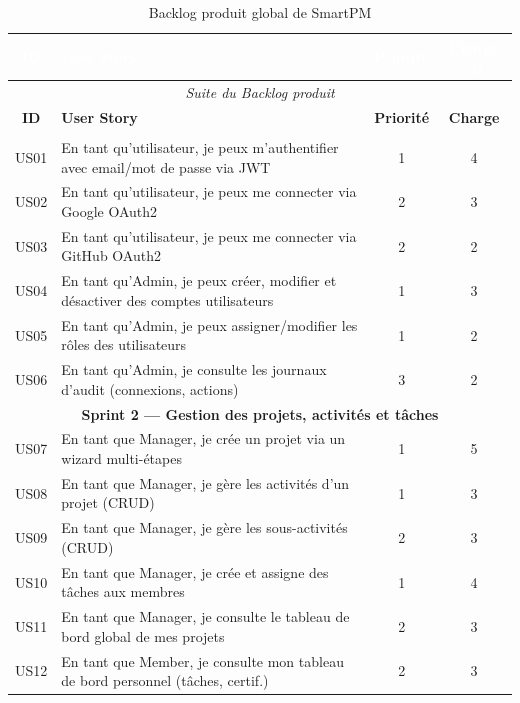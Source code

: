 \begin{longtable}{|c|p{7cm}|c|c|}
  \caption{Backlog produit global de SmartPM}
  \label{tab:backlog} \\
  \hline
  \rowcolor{tablehead}
  \textcolor{white}{\textbf{ID}} &
  \textcolor{white}{\textbf{User Story}} &
  \textcolor{white}{\textbf{Priorité}} &
  \textcolor{white}{\textbf{Charge (j)}} \\
  \hline
  \endfirsthead
  \multicolumn{4}{c}{\textit{Suite du Backlog produit}} \\
  \hline
  \textbf{ID} & \textbf{User Story} & \textbf{Priorité} & \textbf{Charge} \\
  \hline
  \endhead
  \hline
  \endfoot

  \multicolumn{4}{|c|}{\cellcolor{primaryblue!20}\textbf{Sprint 1 — Authentification \& Gestion des utilisateurs}} \\
  \hline
  US01 & En tant qu'utilisateur, je peux m'authentifier avec email/mot de passe via JWT & 1 & 4 \\
  \hline
  US02 & En tant qu'utilisateur, je peux me connecter via Google OAuth2 & 2 & 3 \\
  \hline
  US03 & En tant qu'utilisateur, je peux me connecter via GitHub OAuth2 & 2 & 2 \\
  \hline
  US04 & En tant qu'Admin, je peux créer, modifier et désactiver des comptes utilisateurs & 1 & 3 \\
  \hline
  US05 & En tant qu'Admin, je peux assigner/modifier les rôles des utilisateurs & 1 & 2 \\
  \hline
  US06 & En tant qu'Admin, je consulte les journaux d'audit (connexions, actions) & 3 & 2 \\
  \hline

  \multicolumn{4}{|c|}{\cellcolor{primaryblue!20}\textbf{Sprint 2 — Gestion des projets, activités et tâches}} \\
  \hline
  US07 & En tant que Manager, je crée un projet via un wizard multi-étapes & 1 & 5 \\
  \hline
  US08 & En tant que Manager, je gère les activités d'un projet (CRUD) & 1 & 3 \\
  \hline
  US09 & En tant que Manager, je gère les sous-activités (CRUD) & 2 & 3 \\
  \hline
  US10 & En tant que Manager, je crée et assigne des tâches aux membres & 1 & 4 \\
  \hline
  US11 & En tant que Manager, je consulte le tableau de bord global de mes projets & 2 & 3 \\
  \hline
  US12 & En tant que Member, je consulte mon tableau de bord personnel (tâches, certif.) & 2 & 3 \\
  \hline


\end{longtable}
